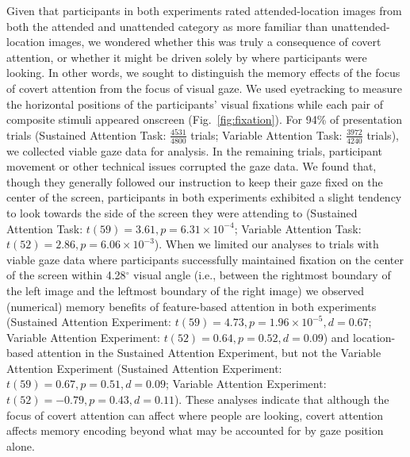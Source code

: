 \documentclass[english]{article}
\begin{document}
Given that participants in both experiments rated attended-location images from
both the attended and unattended category as more familiar than
unattended-location images, we wondered whether this was truly a consequence of
covert attention, or whether it might be driven solely by where participants
were looking. In other words, we sought to distinguish the memory effects of
the focus of covert attention from the focus of visual gaze. We used
eyetracking to measure the horizontal positions of the participants' visual
fixations while each pair of composite stimuli appeared onscreen
(Fig.~\ref{fig:fixation}). For 94\% of presentation trials (Sustained Attention
Task: $\frac{4531}{4800}$ trials; Variable Attention Task: $\frac{3972}{4240}$
trials), we collected viable gaze data for analysis. In the remaining trials,
participant movement or other technical issues corrupted the gaze data. We
found that, though they generally followed our instruction to keep their gaze
fixed on the center of the screen, participants in both experiments exhibited a
slight tendency to look towards the side of the screen they were attending to
(Sustained Attention Task: $t(59) = 3.61, p = 6.31 \times 10^{-4}$; Variable
Attention Task: $t(52) = 2.86, p = 6.06 \times 10^{-3}$). When we limited our
analyses to trials with viable gaze data where participants successfully
maintained fixation on the center of the screen within 4.28$^\circ$ visual
angle (i.e., between the rightmost boundary of the left image and the leftmost
boundary of the right image) we observed (numerical) memory benefits of
feature-based attention in both experiments (Sustained Attention Experiment:
$t(59) = 4.73, p = 1.96 \times 10^{-5}, d = 0.67$; Variable Attention
Experiment: $t(52) = 0.64, p = 0.52, d = 0.09$) and location-based attention in
the Sustained Attention Experiment, but not the Variable Attention Experiment
(Sustained Attention Experiment: $t(59) = 0.67, p = 0.51, d = 0.09$; Variable
Attention Experiment: $t(52) = -0.79, p = 0.43, d = 0.11$). These analyses
indicate that although the focus of covert attention can affect where people
are looking, covert attention affects memory encoding beyond what may be
accounted for by gaze position alone.
\end{document}
